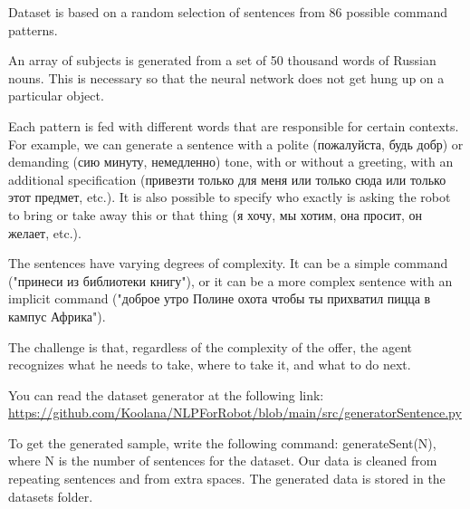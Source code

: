 \documentclass{article}
\begin{document}
Dataset is based on a random selection of sentences from 86 possible command patterns. 

An array of subjects is generated from a set of 50 thousand words of Russian nouns. This is necessary so that the neural network does not get hung up on a particular object.

Each pattern is fed with different words that are responsible for certain contexts.
For example, we can generate a sentence with a polite (пожалуйста, будь добр) or demanding (сию минуту, немедленно) tone, with or without a greeting, with an additional specification (привезти только для меня или только сюда или только этот предмет, etc.). It is also possible to specify who exactly is asking the robot to bring or take away this or that thing (я хочу, мы хотим, она просит, он желает, etc.).

The sentences have varying degrees of complexity. It can be a simple command ("принеси из библиотеки книгу"), or it can be a more complex sentence with an implicit command ("доброе утро Полине охота чтобы ты прихватил пицца в кампус Африка").

The challenge is that, regardless of the complexity of the offer, the agent recognizes what he needs to take, where to take it, and what to do next.

You can read the dataset generator at the following link: \url{https://github.com/Koolana/NLPForRobot/blob/main/src/generatorSentence.py}

To get the generated sample, write the following command: generateSent(N), where N is the number of sentences for the dataset. Our data is cleaned from repeating sentences and from extra spaces. The generated data is stored in the datasets folder.
\end{document}
